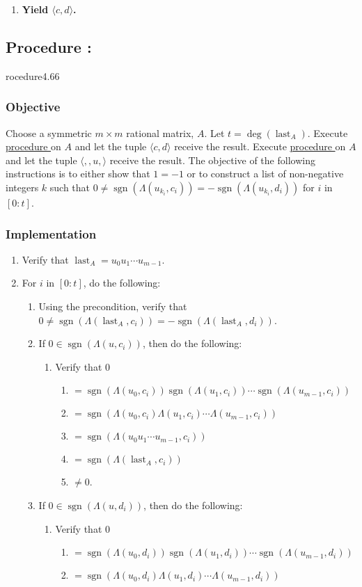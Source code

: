 \documentclass{article}
\DeclareMathOperator{\sgn}{sgn}
\DeclareMathOperator{\last}{last}
\newcounter{procedure}[part]
\newcommand{\procedure}[1]{\subsection*{Procedure \thepart:\theprocedure}\label{sec:procedure #1}\global\expandafter\edef\csname procedure#1\endcsname{\thepart:\theprocedure}\addtocounter{procedure}{1}}
\newcommand{\objective}{\subsubsection*{Objective}}
\newcommand{\implementation}{\subsubsection*{Implementation}}
\newcommand{\procedurehr}[1]{\hyperref[sec:procedure #1]{procedure \expandafter\csname procedure#1\endcsname}}
\begin{document}
\begin{multicols}{2}
\begin{enumerate}
					\item \textbf{Yield $\langle c,d\rangle$.}
				\end{enumerate}
		\procedure{4.66}
			\objective
				Choose a symmetric $m\times m$ rational matrix, $A$. Let $t=\deg(\last_A)$. Execute \procedurehr{4.65} on $A$ and let the tuple $\langle c,d\rangle$ receive the result. Execute \procedurehr{4.25} on $A$ and let the tuple $\langle,,u,\rangle$ receive the result. The objective of the following instructions is to either show that $1=-1$ or to construct a list of non-negative integers $k$ such that $0\ne\sgn(\Lambda(u_{k_i},c_i))=-\sgn(\Lambda(u_{k_i},d_i))$ for $i$ in $[0:t]$.
			\implementation
				\begin{enumerate}
					\item Verify that $\last_A=u_0u_1\cdots u_{m-1}$.
					\item For $i$ in $[0:t]$, do the following:
					\begin{enumerate}
						\item Using the precondition, verify that $0\ne\sgn(\Lambda(\last_A,c_i))=-\sgn(\Lambda(\last_A,d_i))$.
						\item If $0\in\sgn(\Lambda(u,c_i))$, then do the following:
						\begin{enumerate}
							\item Verify that $0$
							\begin{enumerate}
								\item $=\sgn(\Lambda(u_0,c_i))\sgn(\Lambda(u_1,c_i))\cdots\sgn(\Lambda(u_{m-1},c_i))$
								\item $=\sgn(\Lambda(u_0,c_i)\Lambda(u_1,c_i)\cdots\Lambda(u_{m-1},c_i))$
								\item $=\sgn(\Lambda(u_0u_1\cdots u_{m-1},c_i))$
								\item $=\sgn(\Lambda(\last_A,c_i))$
								\item $\ne 0$.
							\end{enumerate}
						\end{enumerate}
						\item If $0\in\sgn(\Lambda(u,d_i))$, then do the following:
						\begin{enumerate}
							\item Verify that $0$
							\begin{enumerate}
								\item $=\sgn(\Lambda(u_0,d_i))\sgn(\Lambda(u_1,d_i))\cdots\sgn(\Lambda(u_{m-1},d_i))$
								\item $=\sgn(\Lambda(u_0,d_i)\Lambda(u_1,d_i)\cdots\Lambda(u_{m-1},d_i))$

\end{enumerate}
\end{enumerate}
\end{enumerate}
\end{enumerate}
\end{multicols}
\end{document}
